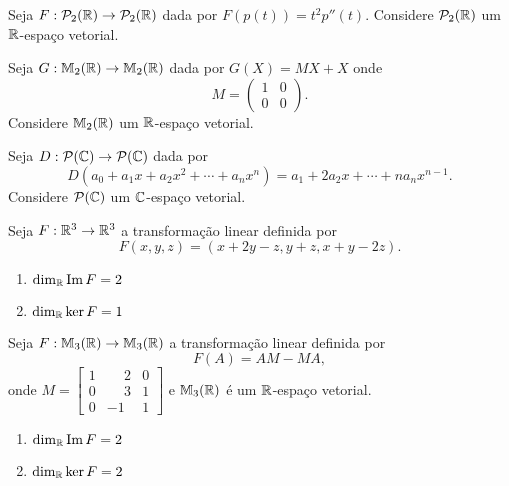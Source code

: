 \documentclass[12pt]{exam}
\begin{document}
\begin{exercicio}
  Seja $F : \mathcal{P}_2(\mathbb{R}) \to \mathcal{P}_2(\mathbb{R})$ dada por $F(p(t)) = t^2p''(t)$. Considere $\mathcal{P}_2(\mathbb{R})$ um $\mathbb{R}$-espa\c{c}o vetorial.
\end{exercicio}

\begin{exercicio}
  Seja $G : \mathbb{M}_2(\mathbb{R}) \to \mathbb{M}_2(\mathbb{R})$ dada por $G(X) = MX + X$ onde
  \[
  M = \begin{pmatrix}
    1 & 0\\
    0 & 0
  \end{pmatrix}.
  \]
  Considere $\mathbb{M}_2(\mathbb{R})$ um $\mathbb{R}$-espa\c{c}o vetorial.
\end{exercicio}

\begin{exercicio}
  Seja $D : \mathcal{P}(\mathbb{C}) \to \mathcal{P}(\mathbb{C})$ dada por
  \[
  D(a_0 + a_1x + a_2x^2 + \cdots + a_nx^n) = a_1 + 2a_2x + \cdots + na_nx^{n - 1}.
  \]
  Considere $\mathcal{P}(\mathbb{C})$ um $\mathbb{C}$-espa\c{c}o vetorial.
\end{exercicio}

\begin{exercicio}
  Seja $F : \mathbb{R}^3 \to \mathbb{R}^3$ a transforma\c{c}\~ao linear definida por
  \[
  F(x,y,z) = (x + 2y - z, y + z, x + y - 2z).
  \]
  \begin{solucao}
    \begin{enumerate}[label=({\alph*})]
      \item $\dim_{\mathbb{R}}{\rm Im\,} F = 2$
      \item $\dim_{\mathbb{R}}\ker F = 1$
    \end{enumerate}
  \end{solucao}
\end{exercicio}

\begin{exercicio}
  Seja $F : \mathbb{M}_3(\mathbb{R}) \to \mathbb{M}_3(\mathbb{R})$ a transforma\c{c}\~ao linear definida por
  \[
  F(A) = AM - MA,
  \]
  onde $M = \begin{bmatrix}
    1 & \phantom{-}2 & 0\\0 & \phantom{-}3 & 1\\0 & -1 & 1
  \end{bmatrix}$ e $\mathbb{M}_3(\mathbb{R})$ \'e um $\mathbb{R}$-espa\c{c}o vetorial.
  \begin{solucao}
    \begin{enumerate}[label=({\alph*})]
      \item $\dim_{\mathbb{R}}{\rm Im\,} F = 2$
      \item $\dim_{\mathbb{R}}\ker F = 2$
    \end{enumerate}
  \end{solucao}
\end{exercicio}
\end{document}
